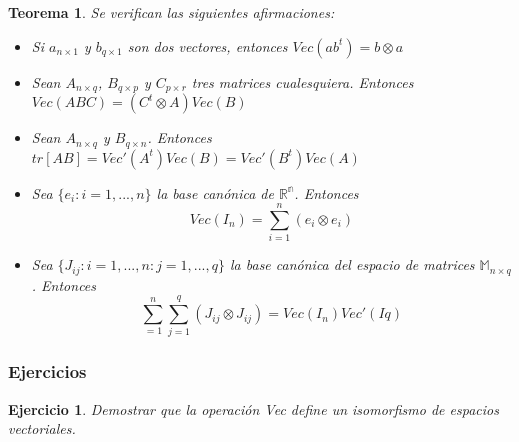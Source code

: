 \documentclass{article}
\theoremstyle{theorem-style}  %
\newtheorem{theorem}{Teorema}[section]  %
\theoremstyle{definition-style}
\theoremstyle{example-style}
\theoremstyle{exercise-style}
\newtheorem{exercise}{Ejercicio}[section]
\begin{document}
	\begin{theorem}
		\textit{Se verifican las siguientes afirmaciones:}
		
		\begin{itemize}
			\item \textit{Si $a_{n \times 1}$ y $b_{q \times 1}$ son dos vectores, entonces $Vec(a b^t )=b \otimes a$}
			
			\item \textit{Sean $A_{n \times q}$, $B_{q \times p}$ y $C_{p \times r }$ tres matrices cualesquiera. Entonces $Vec(ABC) = (C^t \otimes A)Vec(B)$}
			
			\item \textit{Sean $A_{n \times q}$ y $B_{q \times n}$. Entonces $tr[AB] = Vec'(A^t)Vec(B) = Vec'(B^t)Vec(A)$}
			
			\item \textit{Sea $\{e_i: i = 1, ..., n\}$ la base canónica de  $\mathbb{R^n}$. Entonces $$Vec(I_n) = \sum_{i=1}^{n}(e_i \otimes e_i)$$}
			
			\item \textit{Sea $\{J_{ij}: i = 1, ..., n: j = 1, ..., q\}$ la base canónica del espacio de matrices $\mathbb{M}_{n \times q}$. Entonces $$\sum_{=1}^{n}  \sum_{j=1}^{q} (J_{ij} \otimes J_{ij}) = Vec(I_n) Vec'(Iq)$$ }
			
		\end{itemize}
	\end{theorem}

\subsubsection{Ejercicios}

\begin{exercise}
	Demostrar que la operación Vec define un isomorfismo de espacios vectoriales.
\end{exercise}
\end{document}
